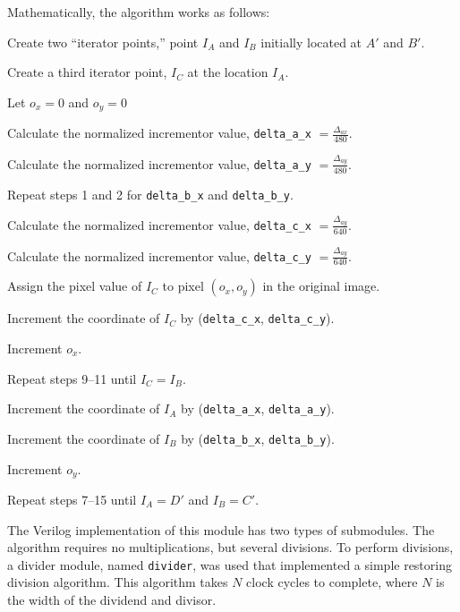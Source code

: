 \documentclass[10pt]{article}
\begin{document}
Mathematically, the algorithm works as follows:
\begin{enumerate*}
\item Create two ``iterator points,'' point $I_A$ and $I_B$ initially located at $A\prime$ and $B\prime$.
\item Create a third iterator point, $I_C$ at the location $I_A$.
\item Let $o_x = 0$ and $o_y = 0$

\item Calculate the normalized incrementor value, {\tt delta\_a\_x} $\displaystyle= \frac{\Delta_{ax}}{480}$.
\item Calculate the normalized incrementor value, {\tt delta\_a\_y} $\displaystyle= \frac{\Delta_{ay}}{480}$.
\item Repeat steps 1 and 2 for {\tt delta\_b\_x} and {\tt delta\_b\_y}.
\item Calculate the normalized incrementor value, {\tt delta\_c\_x} $\displaystyle= \frac{\Delta_{ay}}{640}$.
\item Calculate the normalized incrementor value, {\tt delta\_c\_y} $\displaystyle= \frac{\Delta_{ay}}{640}$.

\item Assign the pixel value of $I_C$ to pixel $(o_x, o_y)$ in the original image.
\item Increment the coordinate of $I_C$ by ({\tt delta\_c\_x}, {\tt delta\_c\_y}).
\item Increment $o_x$.
\item Repeat steps 9--11 until $I_C = I_B$.

\item Increment the coordinate of $I_A$ by ({\tt delta\_a\_x}, {\tt delta\_a\_y}).
\item Increment the coordinate of $I_B$ by ({\tt delta\_b\_x}, {\tt delta\_b\_y}).
\item Increment $o_y$.
\item Repeat steps 7--15 until $I_A = D\prime$ and $I_B = C\prime$.

\end{enumerate*}

The Verilog implementation of this module has two types of submodules. The algorithm requires no multiplications, but several divisions. To perform divisions, a divider module, named {\tt divider}, was used that implemented a simple restoring division algorithm. \cite{restoring} This algorithm takes $N$ clock cycles to complete, where $N$ is the width of the dividend and divisor.
\end{document}
